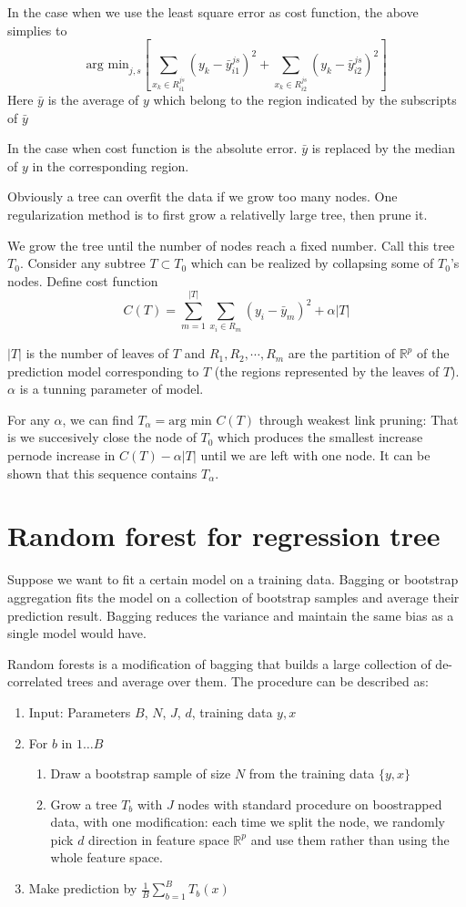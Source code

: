 \documentclass{article}
\begin{document}
In the case when we use the least square error as cost function, the above simplies to
\[
\textrm{arg min}_{j,s}[\sum_{x_k\in R_{i1}^{js}}(y_k-\bar{y}_{i1}^{js})^2+\sum_{x_k\in R_{i2}^{js}}(y_k-\bar{y}_{i2}^{js})^2]\nonumber
\]
Here $\bar{y}$ is the average of $y$ which belong to the region indicated by the subscripts of $\bar{y}$

In the case when cost function is the absolute error. $\bar{y}$ is replaced by the median of $y$ in the corresponding region.

Obviously a tree can overfit the data if we grow too many nodes. One regularization method is to first grow a relativelly large tree, then prune it. 

We grow the tree until the number of nodes reach a fixed number. Call this tree $T_0$. Consider any subtree $T \subset T_0$ which can be realized by collapsing some of $T_0$'s nodes. Define cost function
\[
C(T)=\sum_{m=1}^{|T|}\sum_{x_i\in R_m}(y_i-\bar{y}_m)^2+\alpha|T|
\]

$|T|$ is the number of leaves of $T$ and $R_1, R_2,\cdots, R_m$ are the partition of $\mathbb{R}^p$ of the prediction model corresponding to $T$ (the regions represented by the leaves of $T$). $\alpha$ is a tunning parameter of model. 

For any $\alpha$, we can find $T_\alpha=\textrm{arg min }C(T)$ through weakest link pruning: That is we succesively close the node of $T_0$ which produces the smallest increase pernode increase in $C(T)-\alpha|T|$ until we are left with one node. It can be shown that this sequence contains $T_\alpha$.
\section{Random forest for regression tree}
Suppose we want to fit a certain model on a training data. Bagging or bootstrap aggregation fits the model on a collection of bootstrap samples and average their prediction result. Bagging reduces the variance and maintain the same bias as a single model would have.

Random forests is a modification of bagging that builds a large collection of de-correlated trees and average over them. The procedure can be described as:

\begin{enumerate}
\item
Input: Parameters $B$, $N$, $J$, $d$, training data $y,x$
\item
For $b$ in $1\dots B$
\begin{enumerate}
\item
Draw a bootstrap sample of size $N$ from the training data $\{y,x\}$
\item
Grow a tree $T_b$ with $J$ nodes with standard procedure on boostrapped data, with one modification: each time we split the node, we randomly pick $d$ direction in feature space $\mathbb{R}^p$ and use them rather than using the whole feature space. 
\end{enumerate}
\item
Make prediction by $\frac{1}{B}\sum_{b=1}^BT_b(x)$
\end{enumerate}
\end{document}
